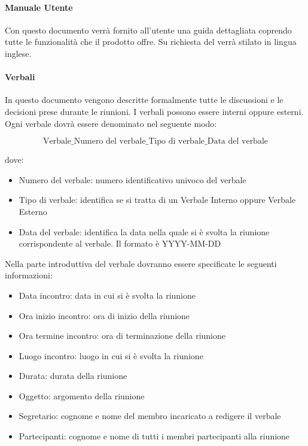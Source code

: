 \paragraph{Manuale Utente  }
Con questo documento verrà fornito all’utente una guida dettagliata coprendo tutte le funzionalità che il prodotto offre.
Su richiesta del  verrà stilato in lingua inglese.


\paragraph{Verbali }
In questo documento vengono descritte formalmente tutte le discussioni
e le decisioni prese durante le riunioni. I verbali possono essere
interni oppure esterni. 
Ogni verbale dovrà essere denominato nel seguente modo: 


$$\text{Verbale}\_\text{Numero del verbale}\_\text{Tipo di verbale}\_\text{Data del verbale} $$

dove:
\begin{itemize}
\item Numero del verbale: numero identificativo univoco del verbale
\item Tipo di verbale: identifica se si tratta di un Verbale Interno oppure Verbale Esterno
\item Data del verbale: identifica la data nella quale si è svolta la riunione corrispondente al verbale. Il formato è YYYY-MM-DD  
\end{itemize}


Nella parte introduttiva del verbale dovranno essere specificate le
seguenti informazioni:
\begin{itemize}
\item Data incontro:  data in cui si è svolta la riunione
\item Ora inizio incontro: ora di inizio della riunione
\item Ora termine incontro: ora di terminazione della riunione
\item Luogo incontro: luogo in cui si è svolta la riunione
\item Durata: durata della riunione
\item Oggetto: argomento della riunione
\item Segretario: cognome e nome del membro incaricato a redigere il verbale
\item Partecipanti: cognome e nome di tutti i membri partecipanti alla
  riunione
\end{itemize}

